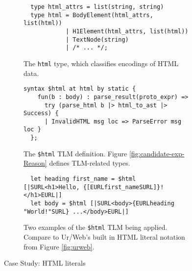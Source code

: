 \documentclass[acmsmall,review,anonymous]{acmart}\settopmatter{printfolios=true,printccs=false,printacmref=false}
\newcommand{\li}[1]{\lstinline[basicstyle=\ttfamily\fontsize{9pt}{1em}\selectfont]{#1}}
\begin{document}
\begin{figure*}[t]

\begin{subfigure}[t]{0.48\textwidth}
\begin{lstlisting}
  type html_attrs = list(string, string)
  type html = BodyElement(html_attrs, list(html))
            | H1Element(html_attrs, list(html))
            | TextNode(string) 
            | /* ... */;
\end{lstlisting}
\caption{The \li{html} type, which classifies encodings of HTML data.}
\label{fig:html-type-def}
\end{subfigure}
\hfill
\begin{subfigure}[t]{0.48\textwidth}
\begin{lstlisting}[mathescape=|]
  syntax $html at html by static {
    fun(b : body) : parse_result(proto_expr) => 
      try (parse_html b |> html_to_ast |> Success) {
      | InvalidHTML msg loc => ParseError msg loc }
  };
\end{lstlisting}
\caption{The \li{$html} TLM definition. Figure \ref{fig:candidate-exp-Reason} defines   TLM-related types.}
\label{fig:html-tlm-def}
\end{subfigure}

\begin{subfigure}[t]{\textwidth}
\begin{lstlisting}
  let heading first_name = $html [|SURL<h1>Hello, {[EURLfirst_nameSURL]}!</h1>EURL|]
  let body = $html [|SURL<body>{EURLheading "World!"SURL} ...</body>EURL|]
\end{lstlisting}
\caption{Two examples of the \li{$html} TLM being applied. Compare to Ur/Web's built in HTML literal notation from Figure \ref{fig:urweb}.  %
}
\label{fig:first-tsm-example}
\end{subfigure}
\caption{Case Study: HTML literals}
\end{figure*}
\end{document}
